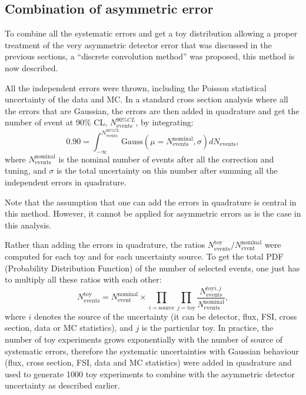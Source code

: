 \subsection{Combination of asymmetric error}
\label{subsec:combinationerror}
To combine all the systematic errors and get a toy distribution
allowing a proper treatment of the very asymmetric detector error that
was discussed in the previous sections, a ``discrete convolution
method'' was proposed, this method is now described.

All the independent errors were thrown, including the Poisson
statistical uncertainty of the data and MC. In a standard cross
section analysis where all the errors that are Gaussian, the errors
are then added in quadrature and get the number of event at 90\%
\Gls{CL}, $N_\text{events}^{90\%CL}$, by integrating:
\begin{equation}
\label{eq:integral}
0.90 = \int^{N_\text{events}^{90\%\text{CL}}}_{-\infty}\text{Gauss}\left(\mu = N_\text{events}^\text{nominal}, \sigma \right) dN_\text{events},
\end{equation}
where $N_\text{events}^\text{nominal}$ is the nominal number of events
after all the correction and tuning, and $\sigma$ is the total
uncertainty on this number after summing all the independent errors in
quadrature.

Note that the assumption that one can add the errors in quadrature is
central in this method. However, it cannot be applied for asymmetric
errors as is the case in this analysis.

Rather than adding the errors in quadrature, the ratios
$N_\text{events}^\text{toy} / N_\text{event}^\text{nominal}$ were
computed for each toy and for each uncertainty source. To get the
total \Gls{PDF} (Probability Distribution Function) of the number of
selected events, one just has to multiply all these ratios with each
other:
\begin{equation}
\label{eq:toycombination}
N_\text{events}^\text{toy} = N_\text{event}^\text{nominal} \times \prod_{i = \text{source}}\prod_{j = \text{toy}}
\frac{N_\text{events}^{\text{toy} i,j}}{N_\text{events}^\text{nominal}},
\end{equation}
where $i$ denotes the source of the uncertainty (it can be detector,
flux, \Gls{FSI}, cross section, data or \Gls{MC} statistics), and $j$
is the particular toy. In practice, the number of toy experiments
grows exponentially with the number of source of systematic errors,
therefore the systematic uncertainties with Gaussian behaviour (flux,
cross section, \Gls{FSI}, data and \Gls{MC} statistics) were added in
quadrature and used to generate 1000 toy experiments to combine with
the asymmetric detector uncertainty as described earlier.

